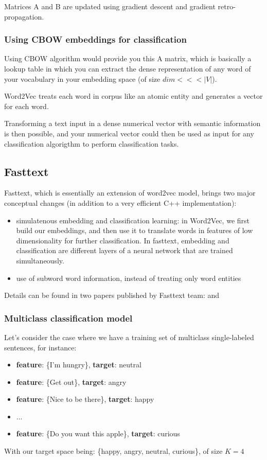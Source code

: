 Matrices A and B are updated using gradient descent and gradient retro-propagation.

\subsubsection{Using CBOW embeddings for classification}

Using CBOW algorithm would provide you this A matrix, which is basically a lookup table in which you can extract the dense representation of any word of your vocabulary in your embedding space (of size $dim <<< |V|$).

Word2Vec treats each word in corpus like an atomic entity and generates a vector for each word.

Transforming a text input in a dense numerical vector with semantic information is then possible, and your numerical vector could then be used as input for any classification algorigthm to perform classification tasks.

\subsection{Fasttext}

Fasttext, which is essentially an extension of word2vec model, brings two major conceptual changes (in addition to a very efficient C++ implementation):
\begin{itemize}
	\item simulatenous embedding and classification learning: in Word2Vec, we first build our embeddings, and then use it to translate words in features of low dimensionality for further classification. In fasttext, embedding and classification are different layers of a neural network that are trained simultaneously.
	\item use of subword word information, instead of treating only word entities
\end{itemize}

Details can be found in two papers published by Fasttext team: \cite[Enriching Word Vectors with Subword Information]{fasttextEnriching} and \cite[Bag of Tricks for Efficient Text Classification]{fasttextTricks}

\subsubsection{Multiclass classification model}

Let's consider the case where we have a training set of multiclass single-labeled sentences, for instance:
\begin{itemize}
	\item \textbf{feature}: \{I'm hungry\}, \textbf{target}: neutral 
	\item \textbf{feature}: \{Get out\}, \textbf{target}: angry
	\item \textbf{feature}: \{Nice to be there\}, \textbf{target}: happy
	\item ...
	\item \textbf{feature}: \{Do you want this apple\}, \textbf{target}: curious
\end{itemize}
With our target space being: \{happy, angry, neutral, curious\}, of size $K=4$

